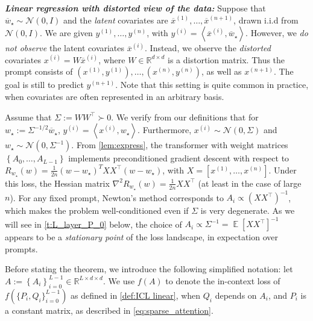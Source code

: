 \documentclass{article}
\DeclareMathOperator{\E}{\mathbb{E}}
\newcommand{\N}{\mathcal{N}}
\newcommand{\R}{\mathbb{R}}
\newcommand{\wstar}{w_\star}
\newcommand{\tx}[1]{x^{(#1)}}
\newcommand{\ty}[1]{y^{(#1)}}
\newcommand{\emphh}[1]{\textbf{\emph{#1}}}
\newcommand*\lin[1]{\left\langle #1 \right\rangle}
\newcommand*\lrb[1]{\left[ #1 \right]}
\newcommand*\lrp[1]{\left( #1 \right)}
\newcommand*\lrbb[1]{\left\{ #1 \right\}}
\begin{document}
\emphh{Linear regression with distorted view of the data:} Suppose that $\overline{w}_\star \sim \mathcal{N}(0,I)$ and the \emph{latent} covariates are $\overline{x}^{(1)},\dots,\overline{x}^{(n+1)}$, drawn i.i.d from $\N(0,I)$. We are given $\ty{1},\dots,\ty{n}$, with $\ty{i} = \lin{\overline{x}^{(i)}, \overline{w}_\star}$. However, we \emph{do not observe} the latent covariates $\overline{x}^{(i)}$. Instead, we observe the \emph{distorted} covariates $\tx{i} = W \overline{x}^{(i)}$, where $W\in \R^{d\times d}$ is a distortion matrix. Thus the prompt consists of $(\tx{1},\ty{1}),\dots,(\tx{n},\ty{n})$, as well as $\tx{n+1}$. The goal is still to predict $\ty{n+1}$. Note that this setting is quite common in practice, when covariates are often represented in an arbitrary basis. 

Assume that $\Sigma := W W^\top \succ 0$. We verify from our definitions that for $\wstar := \Sigma^{-1/2} \overline{w}_\star$, $\ty{i} = \lin{\tx{i},\wstar}$. Furthermore, $\tx{i} \sim \N(0, \Sigma)$ and $\wstar \sim \N(0, \Sigma^{-1})$. From \autoref{lem:express}, the transformer with weight matrices $\lrbb{A_0,\dots,A_{L-1}}$ implements preconditioned gradient descent with respect to $R_{\wstar}(w) = \frac{1}{2n} (w - \wstar)^T X X^\top (w-\wstar)$, with $X = \lrb{\tx{1}, \dots, \tx{n}}$. Under this loss, the Hessian matrix $\nabla^2 R_{\wstar}(w) = \frac{1}{2n} X X^\top$ (at least in the case of large $n$). For any fixed prompt, Newton's method corresponds to $A_i \propto \lrp{X X^\top}^{-1}$, which makes the problem well-conditioned even if $\Sigma$ is very degenerate. As we will see in \autoref{t:L_layer_P_0} below, the choice of $A_i \propto \Sigma^{-1} = \E\lrb{X X^\top}^{-1}$ appears to be a \emph{stationary point} of the loss landscape, in expectation over prompts.

Before stating the theorem, we introduce the following simplified notation: let $A := \lrbb{A_i}_{i=0}^{L-1} \in \R^{L \times d \times d}$. We use $f(A)$ to denote the in-context loss of $f\left(\{P_i, Q_i\}^{L-1}_{i=0}\right)$ as defined in \eqref{def:ICL linear}, when $Q_i$ depends on $A_i$, and $P_i$ is a constant matrix, as described in \eqref{eq:sparse_attention}.
\end{document}
